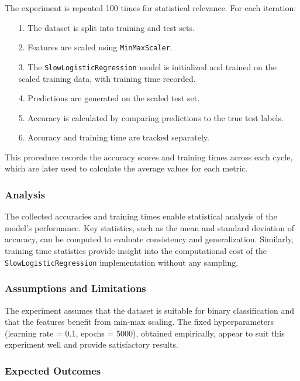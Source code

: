 \documentclass{article}
\theoremstyle{plain}
\theoremstyle{definition}
\theoremstyle{remark}
\begin{document}
The experiment is repeated 100 times for statistical relevance. For each iteration:

\begin{itemize}
 \item [1.] The dataset is split into training and test sets.
 \item [2.] Features are scaled using \texttt{MinMaxScaler}.
 \item [3.] The \texttt{SlowLogisticRegression} model is initialized and trained on the scaled training data, with training time recorded.
 \item [4.] Predictions are generated on the scaled test set.
 \item [5.] Accuracy is calculated by comparing predictions to the true test labels.
 \item [6.] Accuracy and training time are tracked separately.
\end{itemize}

This procedure records the accuracy scores and training times across each cycle, which are later used to calculate the average values for each metric.


\subsubsection{Analysis}

The collected accuracies and training times enable statistical analysis of the model's performance. Key statistics, such as the mean and standard deviation of accuracy, can be computed to evaluate consistency and generalization. Similarly, training time statistics provide insight into the computational cost of the \texttt{SlowLogisticRegression} implementation without any sampling.


\subsubsection{Assumptions and Limitations}

The experiment assumes that the dataset is suitable for binary classification and that the features benefit from min-max scaling. The fixed hyperparameters (learning rate = 0.1, epochs = 5000), obtained empirically, appear to suit this experiment well and provide satisfactory results.


\subsubsection{Expected Outcomes}
\end{document}
